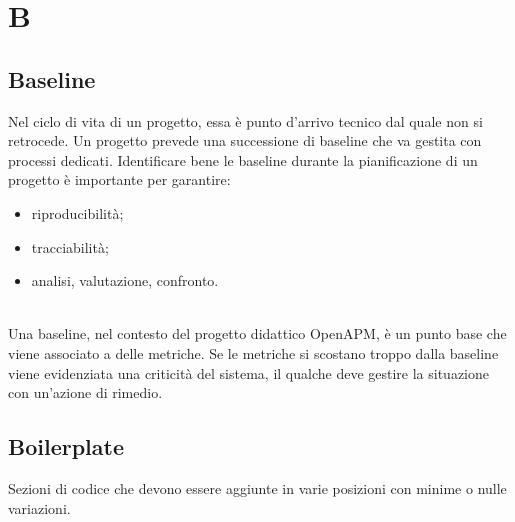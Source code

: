 \section*{B}

    \subsection*{Baseline}

        Nel ciclo di vita di un progetto, essa è punto d'arrivo tecnico dal quale non si retrocede. Un progetto prevede una successione
        di baseline che va gestita con processi dedicati. Identificare bene le baseline durante la pianificazione di un progetto è
        importante per garantire:
        \begin{itemize}
        	\item riproducibilità;
        	\item tracciabilità;
        	\item analisi, valutazione, confronto.
        \end{itemize}
        
        \\
        Una baseline, nel contesto del progetto didattico OpenAPM, è un punto base che viene associato a 
        delle metriche. Se le metriche si scostano troppo dalla baseline viene evidenziata una criticità 
        del sistema, il qualche deve gestire la situazione con un'azione di rimedio.
        
     \subsection*{Boilerplate}
     
     	Sezioni di codice che devono essere aggiunte in varie posizioni con minime o nulle variazioni.